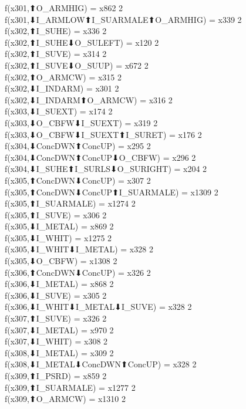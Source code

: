 f(x301,⬆O_ARMHIG) = x862 {2} \\
f(x301,⬇I_ARMLOW⬆I_SUARMALE⬆O_ARMHIG) = x339 {2} \\
f(x302,⬆I_SUHE) = x336 {2} \\
f(x302,⬆I_SUHE⬇O_SULEFT) = x120 {2} \\
f(x302,⬆I_SUVE) = x314 {2} \\
f(x302,⬆I_SUVE⬇O_SUUP) = x672 {2} \\
f(x302,⬆O_ARMCW) = x315 {2} \\
f(x302,⬇I_INDARM) = x301 {2} \\
f(x302,⬇I_INDARM⬆O_ARMCW) = x316 {2} \\
f(x303,⬇I_SUEXT) = x174 {2} \\
f(x303,⬇O_CBFW⬇I_SUEXT) = x319 {2} \\
f(x303,⬇O_CBFW⬇I_SUEXT⬆I_SURET) = x176 {2} \\
f(x304,⬇ConcDWN⬆ConcUP) = x295 {2} \\
f(x304,⬇ConcDWN⬆ConcUP⬇O_CBFW) = x296 {2} \\
f(x304,⬇I_SUHE⬆I_SURLS⬇O_SURIGHT) = x204 {2} \\
f(x305,⬆ConcDWN⬇ConcUP) = x307 {2} \\
f(x305,⬆ConcDWN⬇ConcUP⬆I_SUARMALE) = x1309 {2} \\
f(x305,⬆I_SUARMALE) = x1274 {2} \\
f(x305,⬆I_SUVE) = x306 {2} \\
f(x305,⬇I_METAL) = x869 {2} \\
f(x305,⬇I_WHIT) = x1275 {2} \\
f(x305,⬇I_WHIT⬇I_METAL) = x328 {2} \\
f(x305,⬇O_CBFW) = x1308 {2} \\
f(x306,⬆ConcDWN⬇ConcUP) = x326 {2} \\
f(x306,⬇I_METAL) = x868 {2} \\
f(x306,⬇I_SUVE) = x305 {2} \\
f(x306,⬇I_WHIT⬇I_METAL⬇I_SUVE) = x328 {2} \\
f(x307,⬆I_SUVE) = x326 {2} \\
f(x307,⬇I_METAL) = x970 {2} \\
f(x307,⬇I_WHIT) = x308 {2} \\
f(x308,⬇I_METAL) = x309 {2} \\
f(x308,⬇I_METAL⬇ConcDWN⬆ConcUP) = x328 {2} \\
f(x309,⬆I_PSRD) = x859 {2} \\
f(x309,⬆I_SUARMALE) = x1277 {2} \\
f(x309,⬆O_ARMCW) = x1310 {2} \\
